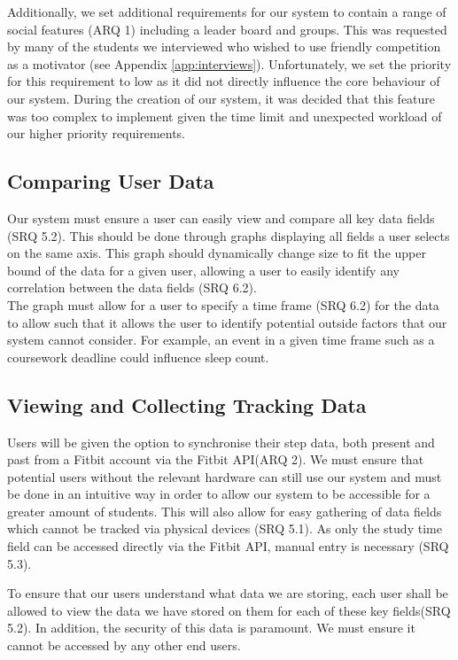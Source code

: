 \documentclass[11pt]{article}
\begin{document}
Additionally, we set additional requirements for our system to contain a range
of social features (ARQ 1) including a leader board and groups. This was
requested by many of the students we interviewed who wished to use friendly
competition as a motivator (see Appendix \ref{app:interviews}). Unfortunately,
we set the priority for this requirement to low as it did not directly
influence the core behaviour of our system. During the creation of our system,
it was decided that this feature was too complex to implement  given the time
limit and unexpected workload of our higher priority requirements.


\subsection{Comparing User Data}

Our system must ensure a user can easily view and compare all key data fields (SRQ 5.2). This should be 
done through graphs displaying all fields a user selects on the same axis. 
This graph should dynamically change size to fit the upper bound of the data for a given user, 
allowing a user to easily identify any correlation between the data fields (SRQ 6.2).\\

The graph must allow for a user to 
specify a time frame (SRQ 6.2) for the data to allow such that 
it allows the user to identify potential outside factors
that our system cannot consider. For example, an event in a given time frame
such as a coursework deadline could influence sleep count. 


\subsection{Viewing and Collecting Tracking Data}

Users will be given the option to synchronise their step data, both present and
past from a Fitbit account via the Fitbit API(ARQ 2). We must ensure that
potential users without the relevant hardware can still use our system and must
be done in an intuitive way in order to allow our system to be accessible for a
greater amount of students. This will also allow for easy gathering of data
fields which cannot be tracked via physical devices (SRQ 5.1). As only the
study time field can be accessed directly via the Fitbit API, manual entry is
necessary (SRQ 5.3).\par

To ensure that our users understand what data we are storing, each user shall
be allowed to view the data we have stored on them for each of these key
fields(SRQ 5.2). In addition, the security of this data is paramount. We must ensure it
cannot be accessed by any other end users.
\end{document}
